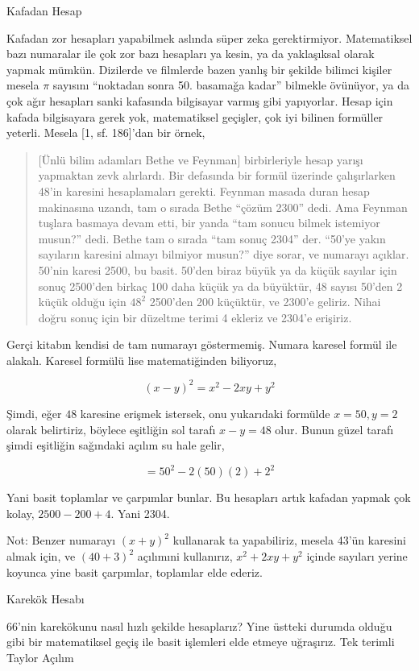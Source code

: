\documentclass[12pt,fleqn]{article}\usepackage{../../common}
\begin{document}
Kafadan Hesap

Kafadan zor hesapları yapabilmek aslında süper zeka gerektirmiyor. Matematiksel
bazı numaralar ile çok zor bazı hesapları ya kesin, ya da yaklaşıksal olarak
yapmak mümkün. Dizilerde ve filmlerde bazen yanlış bir şekilde bilimci kişiler
mesela $\pi$ sayısını ``noktadan sonra 50. basamağa kadar'' bilmekle övünüyor,
ya da çok ağır hesapları sanki kafasında bilgisayar varmış gibi
yapıyorlar. Hesap için kafada bilgisayara gerek yok, matematiksel geçişler, çok
iyi bilinen formüller yeterli. Mesela [1, sf. 186]'dan bir örnek,

\begin{quote}
[Ünlü bilim adamları Bethe ve Feynman] birbirleriyle hesap yarışı yapmaktan zevk
alırlardı. Bir defasında bir formül üzerinde çalışırlarken 48'in karesini
hesaplamaları gerekti. Feynman masada duran hesap makinasına uzandı, tam o
sırada Bethe ``çözüm 2300'' dedi. Ama Feynman tuşlara basmaya devam etti, bir
yanda ``tam sonucu bilmek istemiyor musun?'' dedi. Bethe tam o sırada ``tam
sonuç 2304'' der. ``50'ye yakın sayıların karesini almayı bilmiyor musun?'' diye
sorar, ve numarayı açıklar. 50'nin karesi 2500, bu basit. 50'den biraz büyük ya
da küçük sayılar için sonuç 2500'den birkaç 100 daha küçük ya da büyüktür, 48
sayısı 50'den 2 küçük olduğu için $48^2$ 2500'den 200 küçüktür, ve 2300'e
geliriz. Nihai doğru sonuç için bir düzeltme terimi 4 ekleriz ve 2304'e
erişiriz. 
\end{quote}

Gerçi kitabın kendisi de tam numarayı göstermemiş. Numara karesel formül ile
alakalı. Karesel formülü lise matematiğinden biliyoruz,

$$ (x-y)^2 = x^2 - 2xy + y^2 $$

Şimdi, eğer $48$ karesine erişmek istersek, onu yukarıdaki formülde $x=50,y=2$
olarak belirtiriz, böylece eşitliğin sol tarafı $x-y = 48$ olur. Bunun güzel
tarafı şimdi eşitliğin sağındaki açılım su hale gelir,

$$ = 50^2 - 2(50)(2) + 2^2 $$

Yani basit toplamlar ve çarpımlar bunlar. Bu hesapları artık kafadan yapmak çok
kolay, $2500 - 200 + 4$. Yani 2304.

Not: Benzer numarayı $(x+y)^2$ kullanarak ta yapabiliriz, mesela 43'ün karesini
almak için, ve $(40+3)^2$ açılımıni kullanırız, $x^2+2xy+y^2$ içinde sayıları
yerine koyunca yine basit çarpımlar, toplamlar elde ederiz. 

Karekök Hesabı

66'nin karekökunu nasıl hızlı şekilde hesaplarız? Yine üstteki durumda olduğu
gibi bir matematiksel geçiş ile basit işlemleri elde etmeye uğraşırız. Tek
terimli Taylor Açılım 
\end{document}
